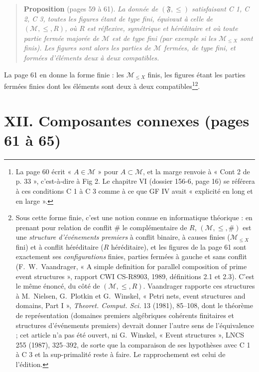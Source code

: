 \documentclass[11pt,a4paper]{article}
\begin{document}
\begin{quote}
\textbf{Proposition} (pages 59 à 61). \emph{La donnée de $(\mathfrak{F}, \leq)$
satisfaisant C 1, C 2, C 3, toutes les figures étant de type fini, équivaut à
celle de $(\mathcal{M}, \leq, R)$, où $R$ est réflexive, symétrique et
héréditaire et où toute partie fermée majorée de $\mathcal{M}$ est de type fini
(par exemple si les $\mathcal{M}_{\leq X}$ sont finis). Les figures sont
alors les parties de $\mathcal{M}$ fermées, de type fini, et formées
d'éléments deux à deux compatibles.}
\end{quote}

La page 61 en donne la forme finie : les $\mathcal{M}_{\leq X}$ finis, les
figures étant les parties fermées finies dont les éléments sont deux à deux
compatibles\footnote{La page 60 écrit « $A \in \mathcal{M}$ » pour $A \subset
\mathcal{M}$, et la marge renvoie à « Cont 2 de p. 33 », c'est-à-dire à Fig 2.
Le chapitre VI (dossier 156-6, page 16) se référera à ces conditions C 1 à C 3
comme à ce que GF IV avait « explicité en long et en large ».}\footnote{Sous cette forme finie, c'est une notion connue en informatique
théorique : en prenant pour relation de conflit $\#$ le complémentaire de $R$,
$(\mathcal{M}, \leq, \#)$ est une \emph{structure d'événements premiers} à
conflit binaire, à causes finies ($\mathcal{M}_{\leq X}$ fini) et à conflit
héréditaire ($R$ héréditaire), et les figures de la page 61 sont exactement
ses \emph{configurations} finies, parties fermées à gauche et sans conflit
(F.~W.~Vaandrager, « A simple definition for parallel composition of prime
event structures », rapport CWI CS-R8903, 1989, définitions 2.1 et 2.3). C'est
le même énoncé, du côté de $(\mathcal{M}, \leq, R)$. Vaandrager rapporte ces
structures à M.~Nielsen, G.~Plotkin et G.~Winskel, « Petri nets, event
structures and domains, Part I », \emph{Theoret. Comput. Sci.} 13 (1981),
85--108, dont le théorème de représentation (domaines premiers algébriques
cohérents finitaires et structures d'événements premiers) devrait donner
l'autre sens de l'équivalence ; cet article n'a pas été ouvert, ni G.~Winskel,
« Event structures », LNCS 255 (1987), 325--392, de sorte que la comparaison de
ses hypothèses avec C 1 à C 3 et la sup-primalité reste à faire. Le
rapprochement est celui de l'édition.}.

\section*{XII. Composantes connexes (pages 61 à 65)}
\end{document}
